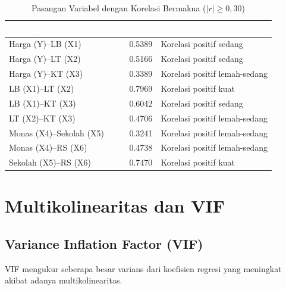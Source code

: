 \documentclass[12pt,a4paper]{article}
\begin{document}
\begin{table}[H]
\centering
\caption{Pasangan Variabel dengan Korelasi Bermakna ($|r|\geq0{,}30$)}
\label{tab:corr_interp}
\small
\begin{tabular}{lrl}
\toprule
\rowcolor{headerblue}
\textcolor{white}{\textbf{Pasangan}} &
\textcolor{white}{\textbf{$r$ Pearson}} &
\textcolor{white}{\textbf{Interpretasi}} \\
\midrule
\rowcolor{rowlight}
Harga (Y)--LB (X1) & 0.5389 & Korelasi positif sedang \\
Harga (Y)--LT (X2) & 0.5166 & Korelasi positif sedang \\
\rowcolor{rowlight}
Harga (Y)--KT (X3) & 0.3389 & Korelasi positif lemah-sedang \\
LB (X1)--LT (X2) & 0.7969 & Korelasi positif kuat \\
\rowcolor{rowlight}
LB (X1)--KT (X3) & 0.6042 & Korelasi positif sedang \\
LT (X2)--KT (X3) & 0.4706 & Korelasi positif lemah-sedang \\
\rowcolor{rowlight}
Monas (X4)--Sekolah (X5) & 0.3241 & Korelasi positif lemah-sedang \\
Monas (X4)--RS (X6) & 0.4738 & Korelasi positif lemah-sedang \\
\rowcolor{rowlight}
Sekolah (X5)--RS (X6) & 0.7470 & Korelasi positif kuat \\
\bottomrule
\end{tabular}
\end{table}

\newpage
\section{Multikolinearitas dan VIF}

\subsection{Variance Inflation Factor (VIF)}
VIF mengukur seberapa besar varians dari koefisien regresi yang meningkat akibat adanya multikolinearitas.
\end{document}
